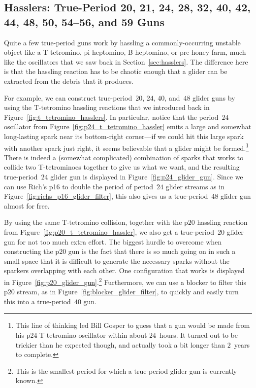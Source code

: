 \subsection{Hasslers: True-Period 20, 21, 24, 28, 32, 40, 42, 44, 48, 50, 54--56, and 59 Guns}\label{sec:true_period_hassler}

Quite a few true-period guns work by hassling a commonly-occurring unstable object like a T-tetromino, pi-heptomino, B-heptomino, or pre-honey farm, much like the oscillators that we saw back in Section~\ref{sec:hasslers}. The difference here is that the hassling reaction has to be chaotic enough that a glider can be extracted from the debris that it produces.

For example, we can construct true-period~$20$, $24$, $40$, and~$48$ glider guns by using the T-tetromino hassling reactions that we introduced back in Figure~\ref{fig:t_tetromino_hasslers}. In particular, notice that the period~$24$ oscillator from Figure~\ref{fig:p24_t_tetromino_hassler} emits a large and somewhat long-lasting spark near its bottom-right corner---if we could hit this large spark with another spark just right, it seems believable that a glider might be formed.\footnote{This line of thinking led Bill Gosper to guess that a gun would be made from his p$24$ T-tetromino oscillator within about $24$~hours. It turned out to be trickier than he expected though, and actually took a bit longer than $2$~years to complete.} There is indeed a (somewhat complicated) combination of sparks that works to collide two T-tetrominoes together to give us what we want, and the resulting true-period~$24$ glider gun is displayed in Figure~\ref{fig:p24_glider_gun}. Since we can use Rich's p16 to double the period of period~$24$ glider streams as in Figure~\ref{fig:richs_p16_glider_filter}, this also gives us a true-period~$48$ glider gun almost for free.

By using the same T-tetromino collision, together with the p$20$ hassling reaction from Figure~\ref{fig:p20_t_tetromino_hassler}, we also get a true-period~$20$ glider gun for not too much extra effort. The biggest hurdle to overcome when constructing the p$20$ gun is the fact that there is so much going on in such a small space that it is difficult to generate the necessary sparks without the sparkers overlapping with each other. One configuration that works is displayed in Figure~\ref{fig:p20_glider_gun}.\footnote{This is the smallest period for which a true-period glider gun is currently known.} Furthermore, we can use a blocker to filter this p$20$ stream, as in Figure~\ref{fig:blocker_glider_filter}, to quickly and easily turn this into a true-period~$40$ gun.


